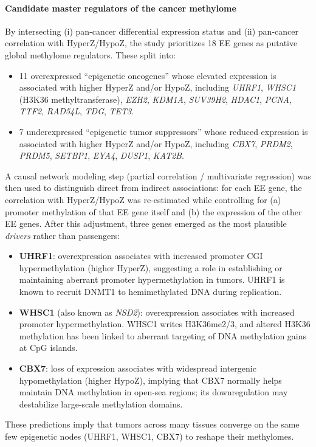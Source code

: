 \documentclass[10pt]{extarticle}
\begin{document}
\paragraph{Candidate master regulators of the cancer methylome}
By intersecting (i) pan-cancer differential expression status and (ii) pan-cancer correlation with HyperZ/HypoZ, the study prioritizes 18 EE genes as putative global methylome regulators. These split into:
\begin{itemize}[label=-]
    \item 11 overexpressed ``epigenetic oncogenes'' whose elevated expression is associated with higher HyperZ and/or HypoZ, including \textit{UHRF1}, \textit{WHSC1} (H3K36 methyltransferase), \textit{EZH2}, \textit{KDM1A}, \textit{SUV39H2}, \textit{HDAC1}, \textit{PCNA}, \textit{TTF2}, \textit{RAD54L}, \textit{TDG}, \textit{TET3}.
    \item 7 underexpressed ``epigenetic tumor suppressors'' whose reduced expression is associated with higher HyperZ and/or HypoZ, including \textit{CBX7}, \textit{PRDM2}, \textit{PRDM5}, \textit{SETBP1}, \textit{EYA4}, \textit{DUSP1}, \textit{KAT2B}.
\end{itemize}
A causal network modeling step (partial correlation / multivariate regression) was then used to distinguish direct from indirect associations: for each EE gene, the correlation with HyperZ/HypoZ was re-estimated while controlling for (a) promoter methylation of that EE gene itself and (b) the expression of the other EE genes. After this adjustment, three genes emerged as the most plausible \textit{drivers} rather than passengers:
\begin{itemize}[label=-]
    \item \textbf{UHRF1}: overexpression associates with increased promoter CGI hypermethylation (higher HyperZ), suggesting a role in establishing or maintaining aberrant promoter hypermethylation in tumors. UHRF1 is known to recruit DNMT1 to hemimethylated DNA during replication.
    \item \textbf{WHSC1} (also known as \textit{NSD2}): overexpression associates with increased promoter hypermethylation. WHSC1 writes H3K36me2/3, and altered H3K36 methylation has been linked to aberrant targeting of DNA methylation gains at CpG islands.
    \item \textbf{CBX7}: loss of expression associates with widespread intergenic hypomethylation (higher HypoZ), implying that CBX7 normally helps maintain DNA methylation in open-sea regions; its downregulation may destabilize large-scale methylation domains.
\end{itemize}
These predictions imply that tumors across many tissues converge on the same few epigenetic nodes (UHRF1, WHSC1, CBX7) to reshape their methylomes.
\end{document}

